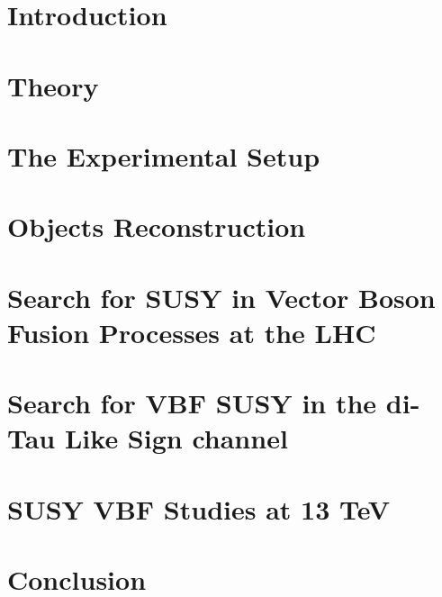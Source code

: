 \documentclass[
twoside=false,
headsepline,     %
headings=normal,
open=any,
numbers=noenddot, %
numbering %
]{scrreprt} %
\begin{document}
\setcounter{page}{1}
\tableofcontents

\cleardoublepage

\setcounter{page}{1}


\chapter{Introduction}
\label{sec:introduction}

\cleardoublepage

\chapter{Theory}
\label{sec:theory}

\cleardoublepage

\chapter{The Experimental Setup}
\label{sec:detector}

\cleardoublepage

\chapter{Objects Reconstruction}
\label{sec:obj_reco}

\cleardoublepage

\chapter{Search for SUSY in Vector Boson Fusion Processes at the LHC}
\label{sec:VBFSUSY}

\cleardoublepage

\chapter{Search for VBF SUSY in the di-Tau Like Sign channel}
\label{sec:analysis}

\cleardoublepage

\chapter{SUSY VBF Studies at 13 TeV}
\label{sec:13TeVanalysis}

\cleardoublepage

\chapter{Conclusion}
\label{sec:conclusion}

\cleardoublepage
\end{document}
